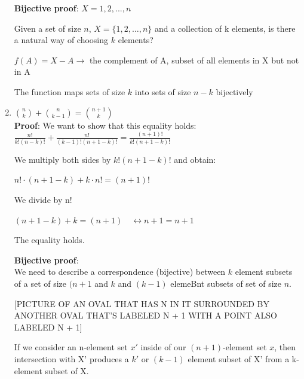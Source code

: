 \documentclass[9pt, letterpaper, oneside]{article}
\newcommand*\dbl{\leftrightarrow}
\begin{document}
\begin{enumerate}
\textbf{Bijective proof}: $X = {1, 2, ..., n}$

Given a set of size $n$, $X = \{1,2,\ldots, n\}$ and a collection of k elements, is there a natural way of choosing $k$ elements?

$f(A) = X-A \to$ the complement of A, subset of all elements in X but not in A

The function maps sets of size $k$ into sets of size $n - k$ bijectively

\item $\displaystyle {n \choose k} + {n \choose k - 1} = {n + 1 \choose k}$\\
\textbf{Proof}:
We want to show that this equality holds: $\displaystyle \frac{n!}{{k}!(n-k)!} + \frac{n!}{(k-1)! (n+1-k)!} = \frac{(n+1)!}{k!(n+1-k)!}$

We multiply both sides by $k!(n+1-k)!$ and obtain:

$\displaystyle n! \cdot (n+1-k) + k \cdot n! = (n+1)!$

We divide by n!

$\displaystyle  (n+1-k) + k = (n+1) \quad \dbl n+1 = n+1$

The equality holds.

\textbf{Bijective proof}:\\
We need to describe a correspondence (bijective) between $k$ element subsets of a set of size $(n + 1$ and $k$ and $(k - 1)$ elemeBnt subsets of set of size $n$.

[PICTURE OF AN OVAL THAT HAS N IN IT SURROUNDED BY ANOTHER OVAL THAT'S LABELED N + 1 WITH A POINT ALSO LABELED N + 1]

If we consider an n-element set $x'$ inside of our $(n + 1)$-element set $x$, then intersection with X' produces a $k'$ or $(k-1)$ element subset of X' from a k-element subset of X.


\end{enumerate}
\end{document}
